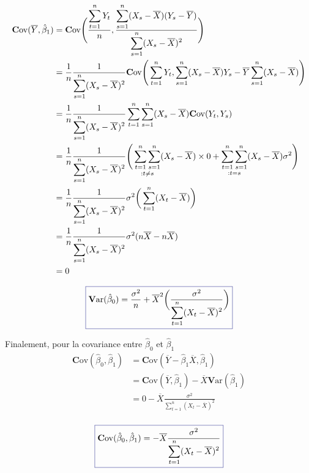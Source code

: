 \documentclass[11pt,french]{report}
\newcommand{\Var}{\mathrm{\textbf{V}ar}}
\newcommand{\Cov}{\mathrm{\textbf{C}ov}}
\begin{document}
\begin{align*}
\Cov(\overline{Y}, \hat{\beta}_1) &= \Cov \Bigg( \frac{\displaystyle\sum_{t=1}^n Y_t}{n}, \frac{\displaystyle\sum_{s=1}^n(X_s- \overline{X})(Y_s - \overline{Y})}{\displaystyle\displaystyle\sum_{s=1}^n(X_s - \overline{X})^2} \Bigg) \\
&= \frac{1}{n}\frac{1}{\displaystyle\sum_{s=1}^n(X_s - \overline{X})^2} \Cov\Bigg(\displaystyle\sum_{t=1}^n Y_t, \displaystyle\sum_{s=1}^n(X_s- \overline{X})Y_s - \overline{Y}\displaystyle\sum_{s=1}^n(X_s- \overline{X}) \Bigg) \\
&= \frac{1}{n}\frac{1}{\displaystyle\displaystyle\sum_{s=1}^n(X_s - \overline{X})^2} \displaystyle\sum_{t=1}^n \displaystyle\sum_{s=1}^n (X_s- \overline{X}) \Cov(Y_t, Y_s) \\
&= \frac{1}{n}\frac{1}{\displaystyle\sum_{s=1}^n(X_s - \overline{X})^2} \Bigg( \mathop{\displaystyle\sum_{t=1}^n \displaystyle\sum_{s=1}^n}_{:t \neq s} (X_s- \overline{X}) \times 0 + \mathop{\displaystyle\sum_{t=1}^n \displaystyle\sum_{s=1}^n}_{:t = s} (X_s- \overline{X}) \sigma^2 \Bigg) \\
&= \frac{1}{n}\frac{1}{\displaystyle\sum_{s=1}^n(X_s - \overline{X})^2}\sigma^2 \bigg( \displaystyle\sum_{t=1}^n (X_t - \overline{X}) \bigg) \\
&= \frac{1}{n}\frac{1}{\displaystyle\sum_{s=1}^n(X_s - \overline{X})^2}\sigma^2 (n\overline{X}- n\overline{X}) \\
&= 0
\end{align*}

\begin{equation}
\label{eq:varbeta0}
\color{Blue}
\boxed{\color{black}
\Var(\hat{\beta}_0) = \frac{\sigma^2}{n}  + \overline{X}^2 \bigg(\frac{\sigma^2}{\displaystyle\sum_{t=1}^n (X_t - \overline{X})^2}\bigg)}
\end{equation}

Finalement, pour la covariance entre $\hat{\beta}_0$ et $\hat{\beta}_1$
\begin{align*}
\Cov(\hat{\beta}_0, \hat{\beta}_1) &= \Cov(\overline{Y} - \hat{\beta}_1\overline{X}, \hat{\beta}_1) \\
&= \Cov(\overline{Y},  \hat{\beta}_1) - \overline{X} \Var(\hat{\beta}_1) \\
&= 0 - \overline{X} \frac{\sigma^2}{\displaystyle\sum_{t=1}^n (X_t - \overline{X})^2} \\
\end{align*}

\begin{equation}
\label{eq:covariance}
\color{Blue}
\boxed{\color{black}
\Cov(\hat{\beta}_0, \hat{\beta}_1) = - \overline{X} \frac{\sigma^2}{\displaystyle\sum_{t=1}^n (X_t - \overline{X})^2}}
\end{equation}
\end{document}
